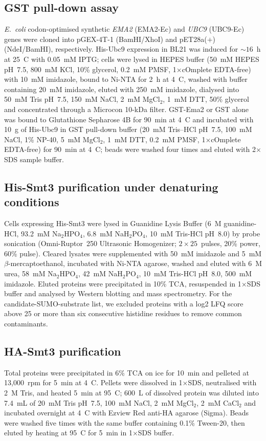 \documentclass[11pt]{article}
\begin{document}
\subsection{GST pull-down assay}
\emph{E.~coli} codon-optimised synthetic \emph{EMA2} (EMA2-Ec) and
\emph{UBC9} (UBC9-Ec) genes were cloned into pGEX-4T-1 (BamHI/XhoI) and
pET28a($+$) (NdeI/BamHI), respectively. His-Ubc9 expression in BL21 was
induced for $\sim16$~h at 25~\textdegree C with 0.05~mM IPTG; cells were
lysed in HEPES buffer (50~mM HEPES pH~7.5, 800~mM KCl, 10\% glycerol,
0.2~mM PMSF, 1$\times$cOmplete EDTA-free) with 10~mM imidazole, bound to
Ni-NTA for 2~h at 4~\textdegree C, washed with buffer containing 20~mM
imidazole, eluted with 250~mM imidazole, dialysed into 50~mM Tris pH~7.5,
150~mM NaCl, 2~mM MgCl$_2$, 1~mM DTT, 50\% glycerol and concentrated
through a Microcon 10-kDa filter. GST-Ema2 or GST alone was bound to
Glutathione Sepharose 4B for 90~min at 4~\textdegree C and incubated with
10~\textmu g of His-Ubc9 in GST pull-down buffer (20~mM Tris--HCl pH~7.5,
100~mM NaCl, 1\% NP-40, 5~mM MgCl$_2$, 1~mM DTT, 0.2~mM PMSF,
1$\times$cOmplete EDTA-free) for 90~min at 4~\textdegree C; beads were
washed four times and eluted with 2$\times$SDS sample buffer.

\subsection{His-Smt3 purification under denaturing conditions}
Cells expressing His-Smt3 were lysed in Guanidine Lysis Buffer (6~M
guanidine-HCl, 93.2~mM Na$_2$HPO$_4$, 6.8~mM NaH$_2$PO$_4$, 10~mM Tris-HCl
pH~8.0) by probe sonication (Omni-Ruptor~250 Ultrasonic Homogenizer;
$2\times25$~pulses, 20\% power, 60\% pulse). Cleared lysates were
supplemented with 50~mM imidazole and 5~mM $\beta$-mercaptoethanol,
incubated with Ni-NTA agarose, washed and eluted with 6~M urea,
58~mM Na$_2$HPO$_4$, 42~mM NaH$_2$PO$_4$, 10~mM Tris-HCl pH~8.0,
500~mM imidazole. Eluted proteins were precipitated in 10\% TCA,
resuspended in 1$\times$SDS buffer and analysed by Western blotting and
mass spectrometry. For the candidate-SUMO-substrate list, we excluded
proteins with a log2 LFQ score above 25 or more than six consecutive
histidine residues to remove common contaminants.

\subsection{HA-Smt3 purification}
Total proteins were precipitated in 6\% TCA on ice for 10~min and pelleted
at 13{,}000~rpm for 5~min at 4~\textdegree C. Pellets were dissolved in
1$\times$SDS, neutralised with 2~M Tris, and heated 5~min at
95~\textdegree C; $600$~\textmu L of dissolved protein was diluted into
7.4~mL of 20~mM Tris pH~7.5, 100~mM NaCl, 2~mM MgCl$_2$, 2~mM CaCl$_2$
and incubated overnight at 4~\textdegree C with Ezview Red anti-HA
agarose (Sigma). Beads were washed five times with the same buffer
containing 0.1\% Tween-20, then eluted by heating at 95~\textdegree C for
5~min in 1$\times$SDS buffer.
\end{document}
